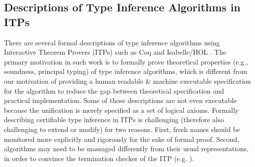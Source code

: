 \subsection{Descriptions of Type Inference Algorithms in ITPs}
There are several formal descriptions of type inference algorithms using
Interactive Theorem Provers (ITPs) such as Coq \cite{Dubois00} and
Isabelle/HOL \cite{UrbanN2009}. The primary motivation %
in such work is to formally prove theoretical properties (e.g., soundness,
principal typing) of type inference algorithms, which is different from
our motivation of providing a human readable \& machine executable
specification for the algorithm to reduce the gap between
theoretical specification and practical implementation. Some of those
descriptions  are not even executable because the unification is merely
specified as a set of logical axioms.
Formally describing certifiable type inference in ITPs is challenging
(therefore also challenging to extend or modify) for two reasons. First, fresh
names should be monitored more explicitly and rigorously for the sake of
formal proof. Second, algorithms may need to be massaged differently from
their usual representations, in order to convince the termination checker of
the ITP (e.g. \cite{JFP:185139}).

